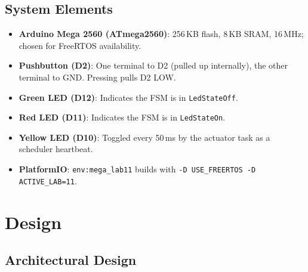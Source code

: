\documentclass[12pt]{article}
\begin{document}
\subsection{System Elements}

\begin{itemize}
  \item \textbf{Arduino Mega 2560 (ATmega2560)}: 256\,KB flash, 8\,KB SRAM, 16\,MHz; chosen for FreeRTOS availability.
  \item \textbf{Pushbutton (D2)}: One terminal to D2 (pulled up internally), the other terminal to GND. Pressing pulls D2 LOW.
  \item \textbf{Green LED (D12)}: Indicates the FSM is in \texttt{LedStateOff}.
  \item \textbf{Red LED (D11)}: Indicates the FSM is in \texttt{LedStateOn}.
  \item \textbf{Yellow LED (D10)}: Toggled every 50\,ms by the actuator task as a scheduler heartbeat.
  \item \textbf{PlatformIO}: \texttt{env:mega\_lab11} builds with \texttt{-D USE\_FREERTOS -D ACTIVE\_LAB=11}. \cite{pio}
\end{itemize}

\section{Design}

\subsection{Architectural Design}
\end{document}
